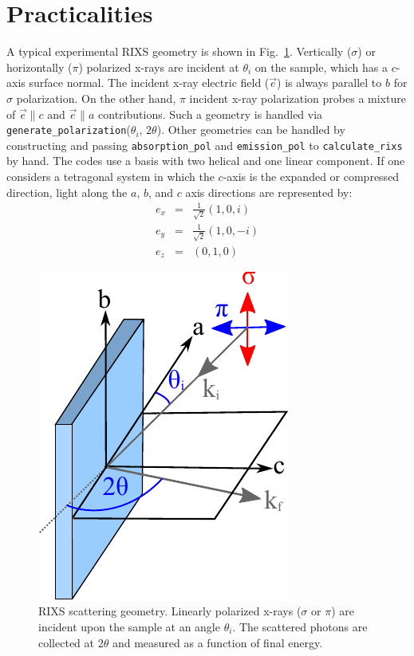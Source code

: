 \documentclass[aps,onecolumn, notitlepage, longbibliography]{revtex4-1}
\begin{document}
\section{Practicalities}

A typical experimental RIXS geometry is shown in Fig.~\ref{geom}. Vertically ($\sigma$) or horizontally ($\pi$) polarized x-rays are incident at $\theta_i$ on the sample, which has a $c$-axis surface normal. The incident x-ray electric field ($\vec{e}$) is always parallel to $b$ for $\sigma$ polarization. On the other hand, $\pi$ incident x-ray polarization probes a mixture of $\vec{e} \parallel c$ and $\vec{e}\parallel a$ contributions.  Such a geometry is handled via \texttt{generate\_polarization}($\theta_i$, $2\theta$). Other geometries can be handled by constructing and passing \texttt{absorption\_pol} and \texttt{emission\_pol} to 
\texttt{calculate\_rixs} by hand. The codes use a basis with two helical and one linear component. If one considers a tetragonal system in which the $c$-axis is the expanded or compressed direction, light along the $a$, $b$, and $c$ axis directions are represented by:
\begin{eqnarray}
e_x &=& \frac{1}{\sqrt{2}} (1, 0, i ) \\
e_y &=& \frac{1}{\sqrt{2}} (1, 0, -i ) \\
e_z &=& (0, 1, 0)
\end{eqnarray}

\begin{figure}
\includegraphics[width=1.7 in]{suppl_geometry.pdf}
\caption{RIXS scattering geometry. Linearly polarized x-rays ($\sigma$ or $\pi$) are incident upon the sample at an angle $\theta _i $. The scattered photons are collected at $2\theta$ and measured as a function of final energy.}
\label{geom}
\end{figure}
\end{document}
